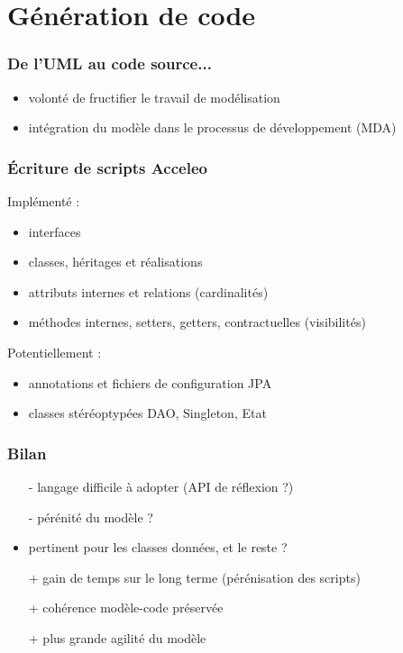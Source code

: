 \section{G\'en\'eration de code}

\begin{frame}
\frametitle{De l'UML au code source...}
\begin{itemize}
\item volont\'e de fructifier le travail de mod\'elisation
\item int\'egration du mod\`ele dans le processus de d\'eveloppement (MDA)
\end{itemize}
\end{frame}

\begin{frame}
\frametitle{\'Ecriture de scripts Acceleo}
Impl\'ement\'e :
\begin{itemize}
\item interfaces
\item classes, h\'eritages et r\'ealisations
\item attributs internes et relations (cardinalit\'es)
\item m\'ethodes internes, setters, getters, contractuelles (visibilit\'es)
\end{itemize}
Potentiellement :
\begin{itemize}
\item annotations et fichiers de configuration JPA
\item classes st\'er\'eoptyp\'ees DAO, Singleton, Etat
\end{itemize}
\end{frame}

\begin{frame}
\frametitle{Bilan}
\begin{itemize}
\item[-] langage difficile \`a adopter (API de r\'eflexion ?)
\item[-] p\'er\'enit\'e du mod\`ele ?
\item pertinent pour les classes donn\'ees, et le reste ?
\item[+] gain de temps sur le long terme (p\'er\'enisation des scripts)
\item[+] coh\'erence mod\`ele-code pr\'eserv\'ee
\item[+] plus grande agilit\'e du mod\`ele
\end{itemize}
\end{frame}
